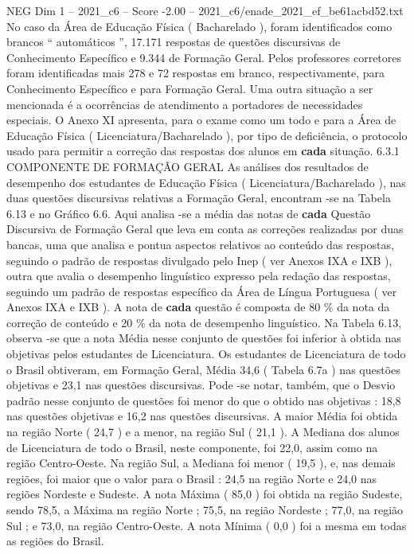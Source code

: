 \begin{textsample}{NEG Dim 1 – 2021\_c6 – Score -2.00 – 2021\_c6/enade\_2021\_ef\_be61acbd52.txt}
No caso da Área de Educação Física ( Bacharelado ), foram identificados como brancos “ automáticos ”, 17.171 respostas de questões discursivas de Conhecimento Específico e 9.344 de Formação Geral.
Pelos professores corretores foram identificadas mais 278 e 72 respostas em branco, respectivamente, para Conhecimento Específico e para Formação Geral.
Uma outra situação a ser mencionada é a ocorrências de atendimento a portadores de necessidades especiais.
O Anexo XI apresenta, para o exame como um todo e para a Área de Educação Física ( Licenciatura/Bacharelado ), por tipo de deficiência, o protocolo usado para permitir a correção das respostas dos alunos em \textbf{cada} situação. 6.3.1 COMPONENTE DE FORMAÇÃO GERAL As análises dos resultados de desempenho dos estudantes de Educação Física ( Licenciatura/Bacharelado ), nas duas questões discursivas relativas a Formação Geral, encontram -se na Tabela 6.13 e no Gráfico 6.6.
Aqui analisa -se a média das notas de \textbf{cada} Questão Discursiva de Formação Geral que leva em conta as correções realizadas por duas bancas, uma que analisa e pontua aspectos relativos ao conteúdo das respostas, seguindo o padrão de respostas divulgado pelo Inep ( ver Anexos IXA e IXB ), outra que avalia o desempenho linguístico expresso pela redação das respostas, seguindo um padrão de respostas específico da Área de Língua Portuguesa ( ver Anexos IXA e IXB ).
A nota de \textbf{cada} questão é composta de 80 \% da nota da correção de conteúdo e 20 \% da nota de desempenho linguístico.
Na Tabela 6.13, observa -se que a nota Média nesse conjunto de questões foi inferior à obtida nas objetivas pelos estudantes de Licenciatura.
Os estudantes de Licenciatura de todo o Brasil obtiveram, em Formação Geral, Média 34,6 ( Tabela 6.7a ) nas questões objetivas e 23,1 nas questões discursivas.
Pode -se notar, também, que o Desvio padrão nesse conjunto de questões foi menor do que o obtido nas objetivas : 18,8 nas questões objetivas e 16,2 nas questões discursivas.
A maior Média foi obtida na região Norte ( 24,7 ) e a menor, na região Sul ( 21,1 ).
A Mediana dos alunos de Licenciatura de todo o Brasil, neste componente, foi 22,0, assim como na região Centro-Oeste.
Na região Sul, a Mediana foi menor ( 19,5 ), e, nas demais regiões, foi maior que o valor para o Brasil : 24,5 na região Norte e 24,0 nas regiões Nordeste e Sudeste.
A nota Máxima ( 85,0 ) foi obtida na região Sudeste, sendo 78,5, a Máxima na região Norte ; 75,5, na região Nordeste ; 77,0, na região Sul ; e 73,0, na região Centro-Oeste.
A nota Mínima ( 0,0 ) foi a mesma em todas as regiões do Brasil.

\end{textsample}
